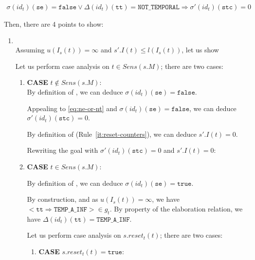 \documentclass[dvipsnames,12pt]{article}
\begin{document}
\begin{niproof}
  \begin{equation}
    \begin{split}
      \sigma(id_t)(\texttt{se})=\mathtt{false}\lor\Delta(id_t)(\texttt{tt})=\mathtt{NOT\_TEMPORAL}\Rightarrow
      \sigma'(id_t)(\texttt{stc})=0
    \end{split}
    \label{eq:ne-or-nt}
  \end{equation}
  
  \noindent{}Then, there are 4 points to show:

  \begin{enumerate}
  \item\label{it:fe-eq-tc-fst}
    \\
    
    Assuming $u(I_s(t))=\infty$ and
    $s'.I(t)\le{}l(I_s(t))$, let us show\\

    Let us perform case analysis on $t\in{}Sens(s.M)$; there are two
    cases:

    \begin{enumerate}
    \item \textbf{CASE} $t\notin{}Sens(s.M)$:\\
      By definition of \upSim, we can deduce
      $\sigma(id_t)(\texttt{se})=\mathtt{false}$.

      Appealing to \eqref{eq:ne-or-nt} and
      $\sigma(id_t)(\texttt{se})=\mathtt{false}$, we can deduce
      $\sigma'(id_t)(\texttt{stc})=0$.

      By definition of \dwSitpn{} (Rule~\ref{it:reset-counters}), we
      can deduce $s'.I(t)=0$.

      Rewriting the goal with $\sigma'(id_t)(\texttt{stc})=0$ and
      $s'.I(t)=0$: 
      
    \item \textbf{CASE} $t\in{}Sens(s.M)$:
      
      By definition of \upSim, we can deduce
      $\sigma(id_t)(\texttt{se})=\mathtt{true}$.

      By construction, and as $u(I_s(t))=\infty$, we have
      ${<}\mathtt{tt\Rightarrow{}TEMP\_A\_INF}{>}\in{}g_t$. By
      property of the elaboration relation, we have
      $\Delta(id_t)(\texttt{tt})=\mathtt{TEMP\_A\_INF}$.

      Let us perform case analysis on $s.reset_t(t)$; there are two
      cases:
      \begin{enumerate}
      \item \textbf{CASE} $s.reset_t(t)=\mathtt{true}$:


\end{enumerate}
\end{enumerate}
\end{enumerate}
\end{niproof}
\end{document}
